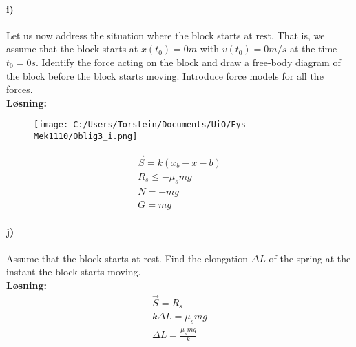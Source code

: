 \documentclass[11pt, A4paper,norsk]{article}
\begin{document}
		\paragraph{i)}
			\begin{flushleft}
Let us now address the situation where the block starts at rest. That is, we assume that the block starts at $x(t_0) = 0m$ with $v(t_0) = 0m/s$ at the time $t_0 = 0s$. Identify the force acting on the block and draw a free-body diagram of the block before the block starts moving. Introduce force models for all the forces. \\
\vspace{1mm}
\textbf{Løsning:} \\
\vspace{1mm}
				\begin{figure}[H]
\texttt{[image: C:/Users/Torstein/Documents/UiO/Fys-Mek1110/Oblig3\_i.png]}
				\end{figure}
				\begin{align}
\vec{S} = k(x_b - x - b) \\
R_s \leq -\mu_s mg \\
N = -mg \\
G = mg
				\end{align}
			\end{flushleft}












			\paragraph{j)}
				\begin{flushleft}
Assume that the block starts at rest. Find the elongation $\Delta L$ of the spring at the instant the block starts moving. \\
\vspace{1mm}
\textbf{Løsning:} \\
\vspace{1mm}
				\begin{align}
\vec{S} = R_s \\
k \Delta L = \mu_s mg \\
\Delta L = \frac{\mu_s mg}{k}
				\end{align}
				\end{flushleft}
\end{document}
